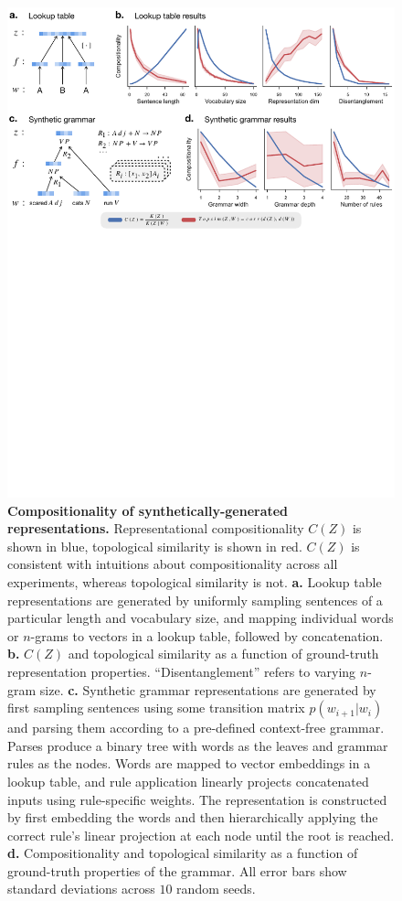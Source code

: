 \documentclass{article} %
\newcommand{\Comp}{Representational compositionality}
\begin{document}
\begin{figure}[ht]
    \centering
    \includegraphics[width=\linewidth]{figures/synthetic.pdf}
    \caption{\textbf{Compositionality of synthetically-generated representations.} \Comp{} $C(Z)$ is shown in blue, topological similarity is shown in red. $C(Z)$ is consistent with intuitions about compositionality across all experiments, whereas topological similarity is not. \textbf{a.} Lookup table representations are generated by uniformly sampling sentences of a particular length and vocabulary size, and mapping individual words or $n$-grams to vectors in a lookup table, followed by concatenation. \textbf{b.} $C(Z)$ and topological similarity as a function of ground-truth representation properties. ``Disentanglement'' refers to varying $n$-gram size. \textbf{c.} Synthetic grammar representations are generated by first sampling sentences using some transition matrix $p(w_{i+1}|w_i)$ and parsing them according to a pre-defined context-free grammar. Parses produce a binary tree with words as the leaves and grammar rules as the nodes. Words are mapped to vector embeddings in a lookup table, and rule application linearly projects concatenated inputs using rule-specific weights. The representation is constructed by first embedding the words and then hierarchically applying the correct rule's linear projection at each node until the root is reached. \textbf{d.} Compositionality and topological similarity as a function of ground-truth properties of the grammar. All error bars show standard deviations across $10$ random seeds.}
    \label{fig:synthetic}
\end{figure}
\end{document}
